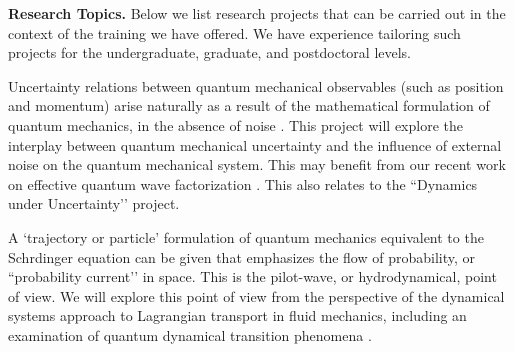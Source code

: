 \documentclass[11pt]{article}
\begin{document}

\medskip
\noindent
{\bf Research Topics.} Below we list   research projects that can be  carried out in the context of the training we have offered.  We have experience tailoring such projects for the undergraduate, graduate, and postdoctoral levels.
 

\smallskip
{} Uncertainty relations between quantum mechanical observables (such as position and momentum) arise naturally as a result of the mathematical formulation of quantum mechanics, in the absence of noise \cite{Griffiths2018IntroductionTQ}. This project will explore the interplay between quantum mechanical uncertainty and the influence of external noise \cite{Abend2016StochasticPI} on the quantum mechanical system. This may benefit from our recent work on effective quantum wave factorization \cite{ZHANG2020132573}. This also relates to the “Dynamics under Uncertainty’’ project.


\smallskip
{}   A `trajectory or particle' formulation of quantum mechanics  equivalent to the Schrdinger equation can be given \cite{Bohmian, Holland1993TheQT} that emphasizes the flow of probability, or ``probability current’’ in space. This is the pilot-wave, or hydrodynamical, point of view. We will explore this point of view from the perspective of the dynamical systems approach to Lagrangian transport in fluid mechanics, including an examination of quantum dynamical transition phenomena \cite{waalkens2007wigner,Micha2006QuantumDW, Mbius1996DittrichWR}. 
\end{document}
